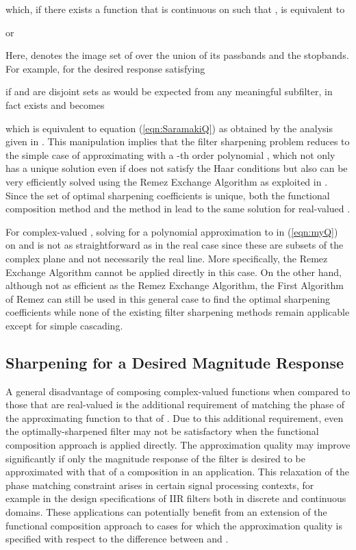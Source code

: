 \documentclass[journal] {IEEEtran}
\begin{document}
which, if there exists a function  that is continuous on  such that , is equivalent to

or

Here,  denotes the image set of  over the union of its passbands and the stopbands. For example, for the desired response  satisfying

if  and  are disjoint sets as would be expected from any meaningful subfilter,  in fact exists and becomes

which is equivalent to equation (\ref{eqn:SaramakiQ}) as obtained by the analysis given in \cite{Saramaki}. This manipulation implies that the filter sharpening problem reduces to the simple case of approximating  with a -th order polynomial , which not only has a unique solution even if  does not satisfy the Haar conditions but also can be very efficiently solved using the Remez Exchange Algorithm as exploited in \cite{Saramaki}. Since the set of optimal sharpening coefficients is unique, both the functional composition method and the method in \cite{Saramaki} lead to the same solution for real-valued .


For complex-valued , solving for a polynomial approximation to  in (\ref{eqn:myQ}) on  and  is not as straightforward as in the real case since these are subsets of the complex plane and not necessarily the real line. More specifically, the Remez Exchange Algorithm cannot be applied directly in this case. On the other hand, although not as efficient as the Remez Exchange Algorithm, the First Algorithm of Remez can still be used in this general case to find the optimal sharpening coefficients while none of the existing filter sharpening methods remain applicable except for simple cascading.


\subsection{Sharpening for a Desired Magnitude Response}
A general disadvantage of composing complex-valued functions when compared to those that are real-valued is the additional requirement of matching the phase of the approximating function  to that of . Due to this additional requirement, even the optimally-sharpened filter may not be satisfactory when the functional composition approach is applied directly. The approximation quality may improve significantly if only the magnitude response of the filter is desired to be approximated with that of a composition in an application. This relaxation of the phase matching constraint arises in certain signal processing contexts, for example in the design specifications of IIR filters both in discrete and continuous domains. These applications can potentially benefit from an extension of the functional composition approach to cases for which the approximation quality is specified with respect to the difference between  and .
\end{document}
